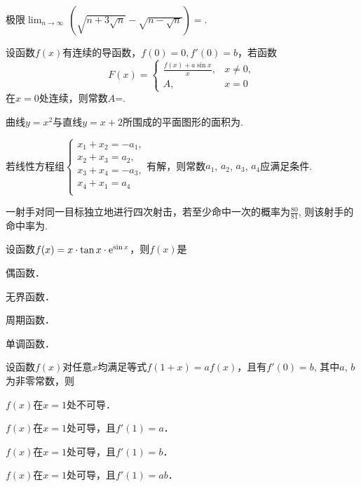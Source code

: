 \documentclass[plain,noanswer,medmath]{../../template/jnuexam}
\begin{document}



\begin{problem}
极限$\lim_{n\to\infty}\,\left(\sqrt{n+3\sqrt{n}}-\sqrt{n-\sqrt{n}}\right)=$\fillin{}.
\end{problem}


\begin{problem}
设函数$f(x)$有连续的导函数，$f(0)=0,f'(0)=b$，若函数
$$F(x)=\begin{cases}
  \frac{f(x)+a\sin x}{x}, & x\ne 0, \\
                       A, & x=0
\end{cases}$$
在$x=0$处连续，则常数$A$=\fillin{}.
\end{problem}


\begin{problem}
曲线$y=x^2$与直线$y=x+2$所围成的平面图形的面积为\fillin{}.
\end{problem}


\begin{problem}
若线性方程组$\begin{cases}
  x_1+x_2=-a_1, \\
  x_2+x_3=a_2, \\
  x_3+x_4=-a_3, \\
  x_4+x_1=a_4 \\
\end{cases}$有解，则常数$a_1$, $a_2$, $a_3$, $a_4$应满足条件\fillin{}.
\end{problem}


\begin{problem}
一射手对同一目标独立地进行四次射击，若至少命中一次的概率为$\frac{80}{81}$,
则该射手的命中率为\fillin{}.
\end{problem}




\begin{problem}
设函数$f(x)=x\cdot \tan x\cdot \mathrm{e}^{\sin x}$，则$f(x)$是\pickout{}
\begin{abcd}
\item 偶函数．
\item 无界函数．
\item 周期函数．
\item 单调函数．
\end{abcd}
\end{problem}


\begin{problem}
设函数$f(x)$对任意$x$均满足等式$f(1+x)=af(x)$，且有$f'(0)=b$,
其中$a$, $b$为非零常数，则\pickout{}
\begin{abcd}
\item $f(x)$在$x=1$处不可导．
\item $f(x)$在$x=1$处可导，且$f'(1)=a$．
\item $f(x)$在$x=1$处可导，且$f'(1)=b$．
\item $f(x)$在$x=1$处可导，且$f'(1)=ab$．
\end{abcd}
\end{problem}
\end{document}
